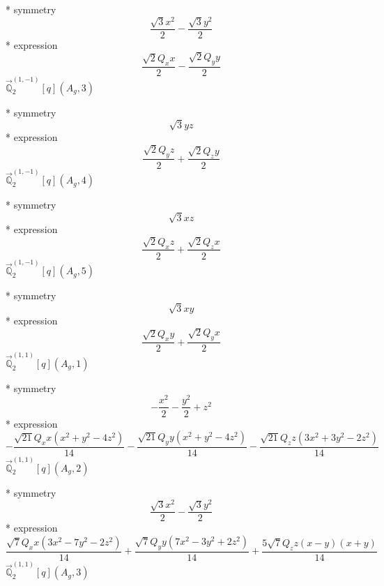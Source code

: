 \documentclass[fleqn,8pt]{jsarticle}
\begin{document}
\noindent\quad ** symmetry
\begin{dmath*}
\frac{\sqrt{3} x^{2}}{2} - \frac{\sqrt{3} y^{2}}{2}
\end{dmath*}
\noindent\quad ** expression
\begin{dmath*}
\frac{\sqrt{2} Q_{x} x}{2} - \frac{\sqrt{2} Q_{y} y}{2}
\end{dmath*}
\noindent\quad $\vec{\mathbb{Q}}_{2}^{(1,-1)}[q](A_{g},3)$

\noindent\quad ** symmetry
\begin{dmath*}
\sqrt{3} y z
\end{dmath*}
\noindent\quad ** expression
\begin{dmath*}
\frac{\sqrt{2} Q_{y} z}{2} + \frac{\sqrt{2} Q_{z} y}{2}
\end{dmath*}
\noindent\quad $\vec{\mathbb{Q}}_{2}^{(1,-1)}[q](A_{g},4)$

\noindent\quad ** symmetry
\begin{dmath*}
\sqrt{3} x z
\end{dmath*}
\noindent\quad ** expression
\begin{dmath*}
\frac{\sqrt{2} Q_{x} z}{2} + \frac{\sqrt{2} Q_{z} x}{2}
\end{dmath*}
\noindent\quad $\vec{\mathbb{Q}}_{2}^{(1,-1)}[q](A_{g},5)$

\noindent\quad ** symmetry
\begin{dmath*}
\sqrt{3} x y
\end{dmath*}
\noindent\quad ** expression
\begin{dmath*}
\frac{\sqrt{2} Q_{x} y}{2} + \frac{\sqrt{2} Q_{y} x}{2}
\end{dmath*}
\noindent\quad $\vec{\mathbb{Q}}_{2}^{(1,1)}[q](A_{g},1)$

\noindent\quad ** symmetry
\begin{dmath*}
- \frac{x^{2}}{2} - \frac{y^{2}}{2} + z^{2}
\end{dmath*}
\noindent\quad ** expression
\begin{dmath*}
- \frac{\sqrt{21} Q_{x} x \left(x^{2} + y^{2} - 4 z^{2}\right)}{14} - \frac{\sqrt{21} Q_{y} y \left(x^{2} + y^{2} - 4 z^{2}\right)}{14} - \frac{\sqrt{21} Q_{z} z \left(3 x^{2} + 3 y^{2} - 2 z^{2}\right)}{14}
\end{dmath*}
\noindent\quad $\vec{\mathbb{Q}}_{2}^{(1,1)}[q](A_{g},2)$

\noindent\quad ** symmetry
\begin{dmath*}
\frac{\sqrt{3} x^{2}}{2} - \frac{\sqrt{3} y^{2}}{2}
\end{dmath*}
\noindent\quad ** expression
\begin{dmath*}
\frac{\sqrt{7} Q_{x} x \left(3 x^{2} - 7 y^{2} - 2 z^{2}\right)}{14} + \frac{\sqrt{7} Q_{y} y \left(7 x^{2} - 3 y^{2} + 2 z^{2}\right)}{14} + \frac{5 \sqrt{7} Q_{z} z \left(x - y\right) \left(x + y\right)}{14}
\end{dmath*}
\noindent\quad $\vec{\mathbb{Q}}_{2}^{(1,1)}[q](A_{g},3)$
\end{document}
